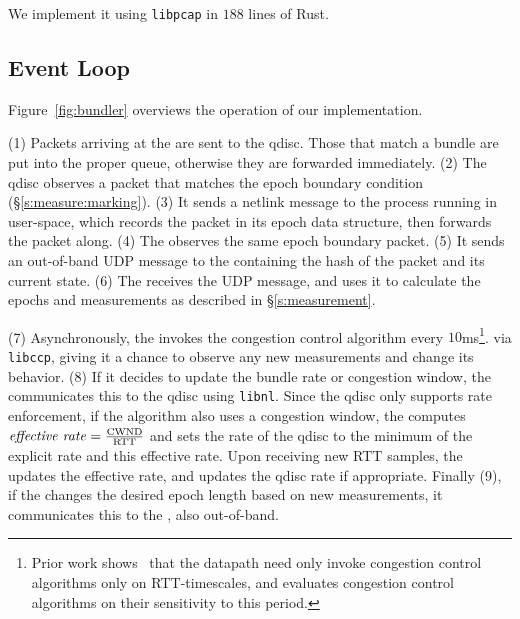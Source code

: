 
\Para{\capoutbox} We implement it using \texttt{libpcap} in $188$ lines of Rust. 

\subsection{\name Event Loop}\label{s:impl:loop}
Figure~\ref{fig:bundler} overviews the operation of our \name implementation.

(1) Packets arriving at the \inbox are sent to the qdisc. Those that match a bundle are put into the proper queue, 
otherwise they are forwarded immediately. (2) The qdisc observes a packet that matches the epoch boundary
condition (\S\ref{s:measure:marking}). (3) It sends a netlink message to the \inbox process running in user-space, which records the packet
in its epoch data structure, then forwards the packet along. (4) The \outbox observes the same epoch boundary
packet. (5) It sends an out-of-band UDP message to the \inbox containing the hash of the packet and its current state. 
(6) The \inbox receives the UDP message, and uses it to calculate the epochs and measurements as described 
in \S\ref{s:measurement}.

(7) Asynchronously, the \inbox invokes the congestion control algorithm every $10$ms\footnote{Prior work shows~\cite{ccp} that the datapath need only invoke congestion control algorithms only on RTT-timescales, and evaluates congestion control algorithms on their sensitivity to this period.}.
via \texttt{libccp},
giving it a chance to observe any new measurements and change its behavior. (8) If it decides to update
the bundle rate or congestion window, the \inbox communicates this to the qdisc
using \texttt{libnl}. Since the qdisc only supports rate enforcement, if the algorithm
also uses a congestion window, the \inbox computes $\text{\emph{effective rate}} = \frac{\text{CWND}}{\text{RTT}}$
and sets the rate of the qdisc to the minimum of the explicit rate and this effective rate.
Upon receiving new RTT samples, the \inbox updates the effective rate, and updates the qdisc rate if appropriate.
Finally (9), if the \inbox changes the desired epoch length based on new measurements, it communicates this to the \outbox, also out-of-band.

